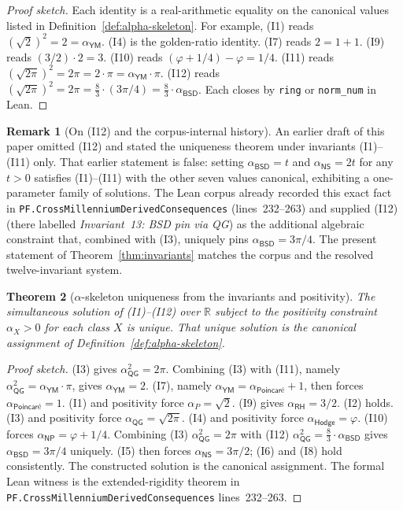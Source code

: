\documentclass[11pt,a4paper]{amsart}
\theoremstyle{plain}
\newtheorem{theorem}{Theorem}[section]
\theoremstyle{definition}
\newtheorem{remark}[theorem]{Remark}
\begin{document}
\begin{proof}[Proof sketch]
Each identity is a real-arithmetic equality on the canonical values listed in Definition~\ref{def:alpha-skeleton}. For example, (I1) reads $(\sqrt{2})^2 = 2 = \alpha_{\textsf{YM}}$. (I4) is the golden-ratio identity. (I7) reads $2 = 1 + 1$. (I9) reads $(3/2)\cdot 2 = 3$. (I10) reads $(\varphi+1/4) - \varphi = 1/4$. (I11) reads $(\sqrt{2\pi})^2 = 2\pi = 2\cdot\pi = \alpha_{\textsf{YM}}\cdot\pi$. (I12) reads $(\sqrt{2\pi})^2 = 2\pi = \tfrac{8}{3}\cdot(3\pi/4) = \tfrac{8}{3}\cdot\alpha_{\textsf{BSD}}$. Each closes by \texttt{ring} or \texttt{norm\_num} in Lean.
\end{proof}

\begin{remark}[On (I12) and the corpus-internal history]\label{rem:I12-history}
An earlier draft of this paper omitted (I12) and stated the uniqueness theorem under invariants (I1)--(I11) only. That earlier statement is false: setting $\alpha_{\textsf{BSD}}=t$ and $\alpha_{\textsf{NS}}=2t$ for any $t>0$ satisfies (I1)--(I11) with the other seven values canonical, exhibiting a one-parameter family of solutions. The Lean corpus already recorded this exact fact in \texttt{PF.CrossMillenniumDerivedConsequences} (lines~232--263) and supplied (I12) (there labelled \emph{Invariant~13: BSD pin via QG}) as the additional algebraic constraint that, combined with (I3), uniquely pins $\alpha_{\textsf{BSD}}=3\pi/4$. The present statement of Theorem~\ref{thm:invariants} matches the corpus and the resolved twelve-invariant system.
\end{remark}

\begin{theorem}[$\alpha$-skeleton uniqueness from the invariants and positivity]\label{thm:alpha-skeleton-unique}
The simultaneous solution of (I1)--(I12) over $\mathbb{R}$ subject to the positivity constraint $\alpha_X > 0$ for each class $X$ is unique. That unique solution is the canonical assignment of Definition~\ref{def:alpha-skeleton}.
\end{theorem}

\begin{proof}[Proof sketch]
(I3) gives $\alpha_{\textsf{QG}}^{2} = 2\pi$. Combining (I3) with (I11), namely $\alpha_{\textsf{QG}}^{2} = \alpha_{\textsf{YM}}\cdot\pi$, gives $\alpha_{\textsf{YM}} = 2$. (I7), namely $\alpha_{\textsf{YM}} = \alpha_{\textsf{Poincar\'e}} + 1$, then forces $\alpha_{\textsf{Poincar\'e}} = 1$. (I1) and positivity force $\alpha_{P} = \sqrt{2}$. (I9) gives $\alpha_{\textsf{RH}} = 3/2$. (I2) holds. (I3) and positivity force $\alpha_{\textsf{QG}} = \sqrt{2\pi}$. (I4) and positivity force $\alpha_{\textsf{Hodge}} = \varphi$. (I10) forces $\alpha_{\textsf{NP}} = \varphi + 1/4$. Combining (I3) $\alpha_{\textsf{QG}}^{2} = 2\pi$ with (I12) $\alpha_{\textsf{QG}}^{2} = \tfrac{8}{3}\cdot\alpha_{\textsf{BSD}}$ gives $\alpha_{\textsf{BSD}} = 3\pi/4$ uniquely. (I5) then forces $\alpha_{\textsf{NS}} = 3\pi/2$; (I6) and (I8) hold consistently. The constructed solution is the canonical assignment. The formal Lean witness is the extended-rigidity theorem in \texttt{PF.CrossMillenniumDerivedConsequences} lines~232--263.
\end{proof}
\end{document}
